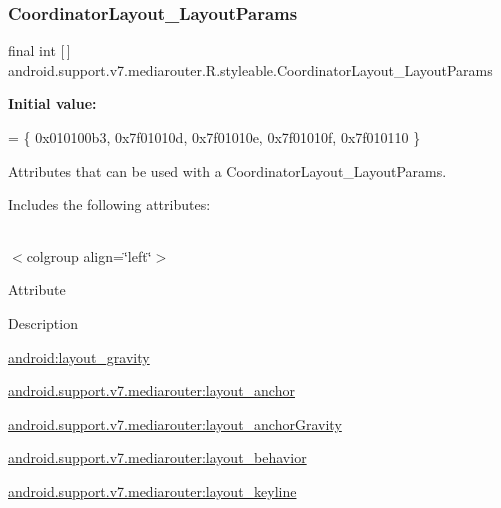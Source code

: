 \subsubsection{\texorpdfstring{Coordinator\+Layout\+\_\+\+Layout\+Params}{CoordinatorLayout\_LayoutParams}}
{\footnotesize\ttfamily final int \mbox{[}$\,$\mbox{]} android.\+support.\+v7.\+mediarouter.\+R.\+styleable.\+Coordinator\+Layout\+\_\+\+Layout\+Params\hspace{0.3cm}{\ttfamily [static]}}

{\bfseries Initial value\+:}
\begin{DoxyCode}
= \{
            0x010100b3, 0x7f01010d, 0x7f01010e, 0x7f01010f,
            0x7f010110
        \}
\end{DoxyCode}
Attributes that can be used with a Coordinator\+Layout\+\_\+\+Layout\+Params. 

Includes the following attributes\+:

\tabulinesep=1mm
\begin{longtabu} spread 0pt [c]{*{0}{|X[-1]}|}
\hline
\end{longtabu}
$<$colgroup align=\char`\"{}left\char`\"{}$>$ 

Attribute

Description 

{\ttfamily \hyperlink{classandroid_1_1support_1_1v7_1_1mediarouter_1_1R_1_1styleable_a6e2ae86a404cb3d13c873f2ad439780a}{android\+:layout\+\_\+gravity}}

{\ttfamily \hyperlink{classandroid_1_1support_1_1v7_1_1mediarouter_1_1R_1_1styleable_a032a1c082915d23c481db8f517cb0efe}{android.\+support.\+v7.\+mediarouter\+:layout\+\_\+anchor}}

{\ttfamily \hyperlink{classandroid_1_1support_1_1v7_1_1mediarouter_1_1R_1_1styleable_a22a95723a15dc3be9d3d0a5455654f10}{android.\+support.\+v7.\+mediarouter\+:layout\+\_\+anchor\+Gravity}}

{\ttfamily \hyperlink{classandroid_1_1support_1_1v7_1_1mediarouter_1_1R_1_1styleable_ade4008b88df0372b323afc6e03e8ae46}{android.\+support.\+v7.\+mediarouter\+:layout\+\_\+behavior}}

{\ttfamily \hyperlink{classandroid_1_1support_1_1v7_1_1mediarouter_1_1R_1_1styleable_a9ac79aa4f24497605b5aa2caad3e872c}{android.\+support.\+v7.\+mediarouter\+:layout\+\_\+keyline}}

